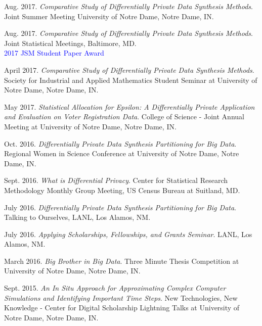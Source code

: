 \begin{etaremune}[topsep=0pt, itemsep=3pt, partopsep=0pt, parsep=0pt]
    \item Aug. 2017. \textit{Comparative Study of Differentially Private Data Synthesis Methods}. Joint Summer Meeting University of Notre Dame, Notre Dame, IN.
    
    \item Aug. 2017. \textit{Comparative Study of Differentially Private Data Synthesis Methods}. Joint Statistical Meetings, Baltimore, MD.\\
    \textcolor{blue}{2017 JSM Student Paper Award}
    
    \item April 2017. \textit{Comparative Study of Differentially Private Data Synthesis Methods}. Society for Industrial and Applied Mathematics Student Seminar at University of Notre Dame, Notre Dame, IN.
    
    \item May 2017. \textit{Statistical Allocation for Epsilon: A Differentially Private Application and Evaluation on Voter Registration Data}. College of Science - Joint Annual Meeting at University of Notre Dame, Notre Dame, IN.
    
    \item Oct. 2016. \textit{Differentially Private Data Synthesis Partitioning for Big Data}. Regional Women in Science Conference at University of Notre Dame, Notre Dame, IN. 
    
    \item Sept. 2016. \textit{What is Differential Privacy}. Center for Statistical Research Methodology Monthly Group Meeting, US Census Bureau at Suitland, MD. 
    
    \item July 2016. \textit{Differentially Private Data Synthesis Partitioning for Big Data}. Talking to Ourselves, LANL, Los Alamos, NM.
    
    \item July 2016. \textit{Applying Scholarships, Fellowships, and Grants Seminar}. LANL, Los Alamos, NM.
    
    \item March 2016. \textit{Big Brother in Big Data}. Three Minute Thesis Competition at University of Notre Dame, Notre Dame, IN.
    
    \item Sept. 2015. \textit{An In Situ Approach for Approximating Complex Computer Simulations and Identifying Important Time Steps}. New Technologies, New Knowledge - Center for Digital Scholarship Lightning Talks at University of Notre Dame, Notre Dame, IN.
    

\end{etaremune}
